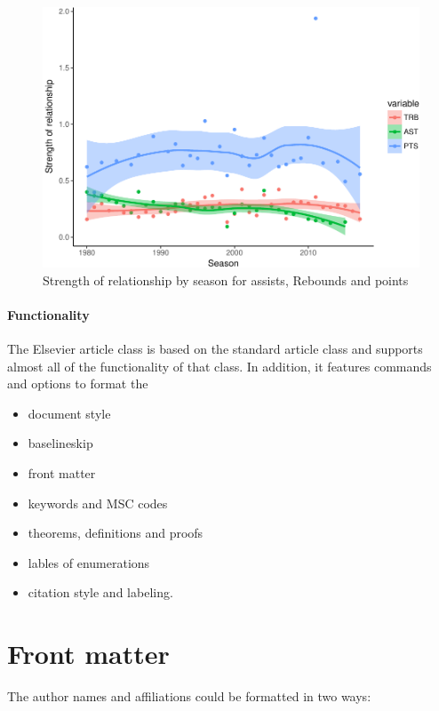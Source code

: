 \documentclass[]{elsarticle} %
\makeatletter
\def\maxwidth{\ifdim\Gin@nat@width>\linewidth\linewidth
\else\Gin@nat@width\fi}
\let\Oldincludegraphics\includegraphics
\renewcommand{\includegraphics}[1]{\Oldincludegraphics[width=\maxwidth]{#1}}
\makeatother
\begin{document}
\begin{figure}[htbp]
\centering
\includegraphics{Coaching_Selection_files/figure-latex/unnamed-chunk-16-1.pdf}
\caption{Strength of relationship by season for assists, Rebounds and
points}
\end{figure}

\paragraph{Functionality}\label{functionality}

The Elsevier article class is based on the standard article class and
supports almost all of the functionality of that class. In addition, it
features commands and options to format the

\begin{itemize}
\item
  document style
\item
  baselineskip
\item
  front matter
\item
  keywords and MSC codes
\item
  theorems, definitions and proofs
\item
  lables of enumerations
\item
  citation style and labeling.
\end{itemize}

\section{Front matter}\label{front-matter}

The author names and affiliations could be formatted in two ways:
\end{document}
